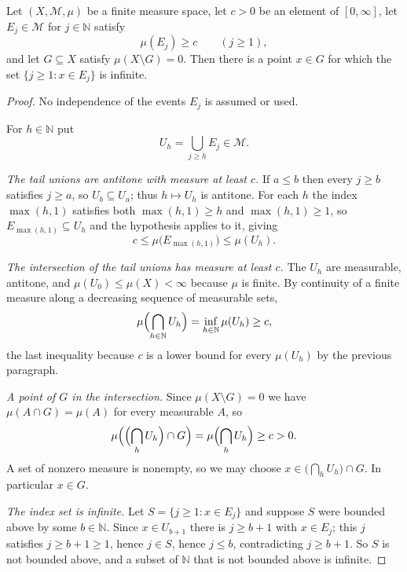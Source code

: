 \begin{helper}
Let $(X,\mathcal M,\mu)$ be a finite measure space, let $c>0$ be an element of
$[0,\infty]$, let $E_j\in\mathcal M$ for $j\in\mathbb N$ satisfy
\[
  \mu(E_j)\ge c\qquad(j\ge1),
\]
and let $G\subseteq X$ satisfy $\mu(X\setminus G)=0$. Then there is a point
$x\in G$ for which the set $\{j\ge1:x\in E_j\}$ is infinite.
\end{helper}
\begin{proof}
No independence of the events $E_j$ is assumed or used.

For $h\in\mathbb N$ put
\[
  U_h=\bigcup_{j\ge h}E_j\in\mathcal M .
\]

\emph{The tail unions are antitone with measure at least $c$.} If $a\le b$ then
every $j\ge b$ satisfies $j\ge a$, so $U_b\subseteq U_a$; thus $h\mapsto U_h$ is
antitone. For each $h$ the index $\max(h,1)$ satisfies both $\max(h,1)\ge h$ and
$\max(h,1)\ge1$, so $E_{\max(h,1)}\subseteq U_h$ and the hypothesis applies to
it, giving
\[
  c\le\mu\bigl(E_{\max(h,1)}\bigr)\le\mu(U_h).
\]

\emph{The intersection of the tail unions has measure at least $c$.} The
$U_h$ are measurable, antitone, and $\mu(U_0)\le\mu(X)<\infty$ because $\mu$ is
finite. By continuity of a finite measure along a decreasing sequence of
measurable sets,
\[
  \mu\Bigl(\bigcap_{h\in\mathbb N}U_h\Bigr)=\inf_{h\in\mathbb N}\mu(U_h)\ge c,
\]
the last inequality because $c$ is a lower bound for every $\mu(U_h)$ by the
previous paragraph.

\emph{A point of $G$ in the intersection.} Since $\mu(X\setminus G)=0$ we have
$\mu(A\cap G)=\mu(A)$ for every measurable $A$, so
\[
  \mu\Bigl(\Bigl(\bigcap_hU_h\Bigr)\cap G\Bigr)
   =\mu\Bigl(\bigcap_hU_h\Bigr)\ge c>0 .
\]
A set of nonzero measure is nonempty, so we may choose
$x\in\bigl(\bigcap_hU_h\bigr)\cap G$. In particular $x\in G$.

\emph{The index set is infinite.} Let $S=\{j\ge1:x\in E_j\}$ and suppose $S$
were bounded above by some $b\in\mathbb N$. Since $x\in U_{b+1}$ there is
$j\ge b+1$ with $x\in E_j$; this $j$ satisfies $j\ge b+1\ge1$, hence $j\in S$,
hence $j\le b$, contradicting $j\ge b+1$. So $S$ is not bounded above, and a
subset of $\mathbb N$ that is not bounded above is infinite.
\end{proof}

